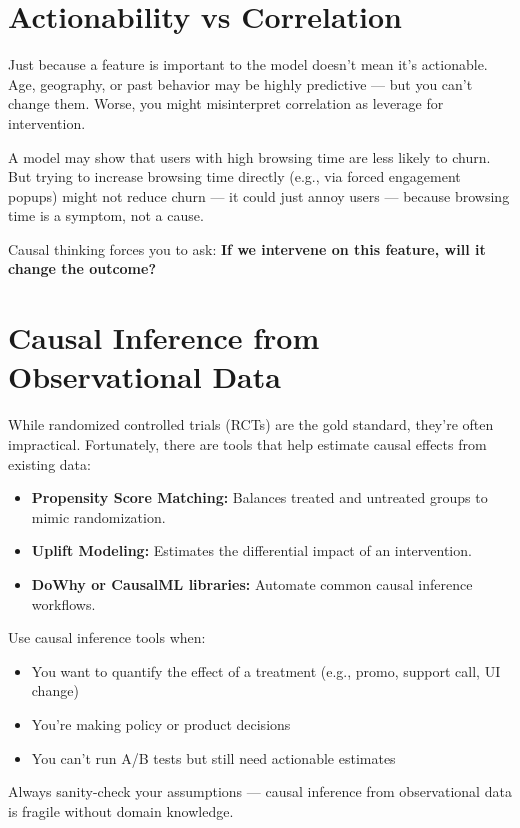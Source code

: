 \documentclass[12pt,openany]{book}
\begin{document}
\section{Actionability vs Correlation}

Just because a feature is important to the model doesn't mean it's actionable. Age, geography, or past behavior may be highly predictive — but you can’t change them. Worse, you might misinterpret correlation as leverage for intervention.

\begin{examplebox}
A model may show that users with high browsing time are less likely to churn. But trying to increase browsing time directly (e.g., via forced engagement popups) might not reduce churn — it could just annoy users — because browsing time is a symptom, not a cause.
\end{examplebox}

Causal thinking forces you to ask: \textbf{If we intervene on this feature, will it change the outcome?}

\section{Causal Inference from Observational Data}

While randomized controlled trials (RCTs) are the gold standard, they’re often impractical. Fortunately, there are tools that help estimate causal effects from existing data:
\begin{itemize}
  \item \textbf{Propensity Score Matching:} Balances treated and untreated groups to mimic randomization.
  \item \textbf{Uplift Modeling:} Estimates the differential impact of an intervention.
  \item \textbf{DoWhy or CausalML libraries:} Automate common causal inference workflows.
\end{itemize}

Use causal inference tools when:
\begin{itemize}
  \item You want to quantify the effect of a treatment (e.g., promo, support call, UI change)
  \item You’re making policy or product decisions
  \item You can’t run A/B tests but still need actionable estimates
\end{itemize}

\begin{notebox}
Always sanity-check your assumptions — causal inference from observational data is fragile without domain knowledge.
\end{notebox}
\end{document}
